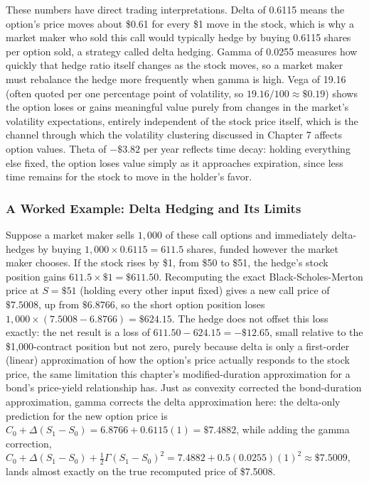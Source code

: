 \documentclass[../ai_in_finance]{subfiles}
\begin{document}
These numbers have direct trading interpretations. Delta of 0.6115 means the option's price moves about \$0.61 for every \$1 move in the stock, which is why a market maker who sold this call would typically hedge by buying 0.6115 shares per option sold, a strategy called delta hedging. Gamma of 0.0255 measures how quickly that hedge ratio itself changes as the stock moves, so a market maker must rebalance the hedge more frequently when gamma is high. Vega of 19.16 (often quoted per one percentage point of volatility, so $19.16/100 \approx \$0.19$) shows the option loses or gains meaningful value purely from changes in the market's volatility expectations, entirely independent of the stock price itself, which is the channel through which the volatility clustering discussed in Chapter 7 affects option values. Theta of $-\$3.82$ per year reflects time decay: holding everything else fixed, the option loses value simply as it approaches expiration, since less time remains for the stock to move in the holder's favor.

\subsubsection*{A Worked Example: Delta Hedging and Its Limits}

Suppose a market maker sells $1{,}000$ of these call options and immediately delta-hedges by buying $1{,}000 \times 0.6115 = 611.5$ shares, funded however the market maker chooses. If the stock rises by \$1, from \$50 to \$51, the hedge's stock position gains $611.5 \times \$1 = \$611.50$. Recomputing the exact Black-Scholes-Merton price at $S=\$51$ (holding every other input fixed) gives a new call price of $\$7.5008$, up from $\$6.8766$, so the short option position loses $1{,}000 \times (7.5008 - 6.8766) = \$624.15$. The hedge does not offset this loss exactly: the net result is a loss of $611.50 - 624.15 = -\$12.65$, small relative to the \$1,000-contract position but not zero, purely because delta is only a first-order (linear) approximation of how the option's price actually responds to the stock price, the same limitation this chapter's modified-duration approximation for a bond's price-yield relationship has.
Just as convexity corrected the bond-duration approximation, gamma corrects the delta approximation here: the delta-only prediction for the new option price is $C_0 + \Delta(S_1-S_0) = 6.8766 + 0.6115(1) = \$7.4882$, while adding the gamma correction, $C_0 + \Delta(S_1-S_0) + \tfrac{1}{2}\Gamma(S_1-S_0)^2 = 7.4882 + 0.5(0.0255)(1)^2 \approx \$7.5009$, lands almost exactly on the true recomputed price of \$7.5008.
\end{document}

